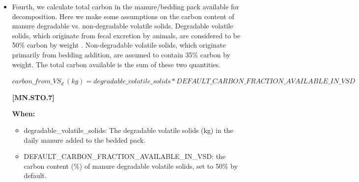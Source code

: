 \begin{refsection}
\begin{itemize}
        \textbf{When:}

        \begin{itemize}
            \item oxygen\_mole\_fraction: mole fraction of oxygen in the air within the bedded pack, unitless, set at 0.15. This is a simplification as oxygen content of the manure pack is not currently modeled.
            \item oxygen\_half\_saturation\_constant: the half-saturation constant, unitless, set at 0.02 by the original publication.
            \item oxygen\_ambient\_air\_mole\_fraction: the mole fraction of oxygen in ambient air, unitless, set at 0.21 (ambient air is approximately 21\% oxygen).
        \end{itemize}
        \vspace{0.5cm}

        \item Fourth, we calculate total carbon in the manure/bedding pack available for decomposition. Here we make some assumptions on the carbon content of manure degradable vs. non-degradable volatile solids. Degradable volatile solids, which originate from fecal excretion by animals, are considered to be 50\% carbon by weight \parencite{larney2011}. Non-degradable volatile solids, which originate primarily from bedding addition, are assumed to contain 35\% carbon by weight. The total carbon available is the sum of these two quantities.  
            \vspace{0.5cm}        
    
        \begin{center}
        \(carbon\_from\_VS_d\ (kg) = degradable\_volatile\_solids * DEFAULT\_CARBON\_FRACTION\_AVAILABLE\_IN\_VSD\)
        \end{center}
        \vspace{0.5cm} 
    
            {\raggedleft \textbf{[MN.STO.7]}\par}
            \vspace{0.5cm}

        \textbf{When:}

        \begin{itemize}
            \item degradable\_volatile\_solids: The degradable volatile solids (kg) in the daily manure added to the bedded pack.
            \item DEFAULT\_CARBON\_FRACTION\_AVAILABLE\_IN\_VSD: the carbon content (\%) of manure degradable volatile solids, set to 50\% by default. 


\end{itemize}
\end{itemize}
\end{refsection}
